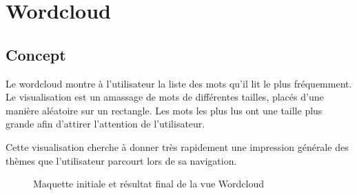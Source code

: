 

%
%
%
%

\section{Wordcloud}

	\subsection{Concept}

		Le wordcloud montre à l'utilisateur la liste des mots qu'il lit le plus fréquemment. Le visualisation est un amassage de mots de différentes tailles, placés d'une manière aléatoire sur un rectangle. Les mots les plus lus ont une taille plus grande afin d'attirer l'attention de l'utilisateur.

		Cette visualisation cherche à donner très rapidement une impression générale des thèmes que l'utilisateur parcourt lors de sa navigation.

		\begin{figure}[!h]
			\centering
			\caption{Maquette initiale et résultat final de la vue Wordcloud}
			\label{wordcloud_images}
		\end{figure}

